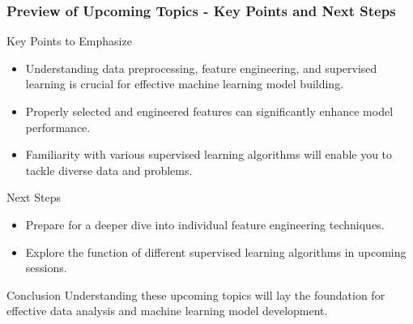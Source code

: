 \documentclass[aspectratio=169]{beamer}
\begin{document}
\begin{frame}[fragile]
  \frametitle{Preview of Upcoming Topics - Key Points and Next Steps}

  \begin{block}{Key Points to Emphasize}
    \begin{itemize}
      \item Understanding data preprocessing, feature engineering, and supervised learning is crucial for effective machine learning model building.
      \item Properly selected and engineered features can significantly enhance model performance.
      \item Familiarity with various supervised learning algorithms will enable you to tackle diverse data and problems.
    \end{itemize}
  \end{block}

  \begin{block}{Next Steps}
    \begin{itemize}
      \item Prepare for a deeper dive into individual feature engineering techniques.
      \item Explore the function of different supervised learning algorithms in upcoming sessions.
    \end{itemize}
  \end{block}

  \begin{block}{Conclusion}
    Understanding these upcoming topics will lay the foundation for effective data analysis and machine learning model development.
  \end{block}
\end{frame}
\end{document}
